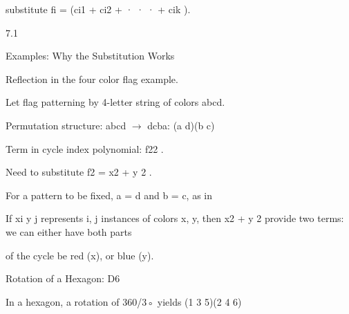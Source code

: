 \documentclass[a4paper,portrait,12pt]{article}
\begin{document}
\begin{flushleft}
substitute fi = (ci1 + ci2 + · · · + cik ).
\end{flushleft}





7.1





\begin{flushleft}
Examples: Why the Substitution Works
\end{flushleft}





\begin{flushleft}
Reflection in the four color flag example.
\end{flushleft}


\begin{flushleft}
Let flag patterning by 4-letter string of colors abcd.
\end{flushleft}


\begin{flushleft}
Permutation structure: abcd $\rightarrow$ dcba: (a d)(b c)
\end{flushleft}


\begin{flushleft}
Term in cycle index polynomial: f22 .
\end{flushleft}


\begin{flushleft}
Need to substitute f2 = x2 + y 2 .
\end{flushleft}


\begin{flushleft}
For a pattern to be fixed, a = d and b = c, as in
\end{flushleft}


\begin{flushleft}
If xi y j represents i, j instances of colors x, y, then x2 + y 2 provide two terms: we can either have both parts
\end{flushleft}


\begin{flushleft}
of the cycle be red (x), or blue (y).
\end{flushleft}


\begin{flushleft}
Rotation of a Hexagon: D6
\end{flushleft}


\begin{flushleft}
In a hexagon, a rotation of 360/3◦ yields (1 3 5)(2 4 6)
\end{flushleft}
\end{document}
